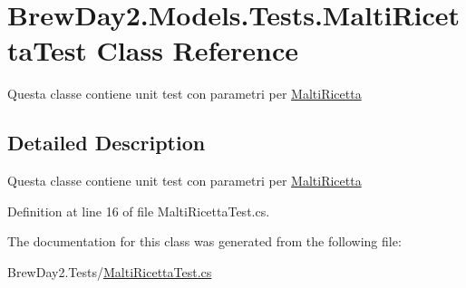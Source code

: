 \hypertarget{class_brew_day2_1_1_models_1_1_tests_1_1_malti_ricetta_test}{}\section{Brew\+Day2.\+Models.\+Tests.\+Malti\+Ricetta\+Test Class Reference}
\label{class_brew_day2_1_1_models_1_1_tests_1_1_malti_ricetta_test}


Questa classe contiene unit test con parametri per \mbox{\hyperlink{class_brew_day2_1_1_models_1_1_malti_ricetta}{Malti\+Ricetta}} 




\subsection{Detailed Description}
Questa classe contiene unit test con parametri per \mbox{\hyperlink{class_brew_day2_1_1_models_1_1_malti_ricetta}{Malti\+Ricetta}}



Definition at line 16 of file Malti\+Ricetta\+Test.\+cs.



The documentation for this class was generated from the following file\+:\begin{DoxyCompactItemize}
\item 
Brew\+Day2.\+Tests/\mbox{\hyperlink{_malti_ricetta_test_8cs}{Malti\+Ricetta\+Test.\+cs}}\end{DoxyCompactItemize}
